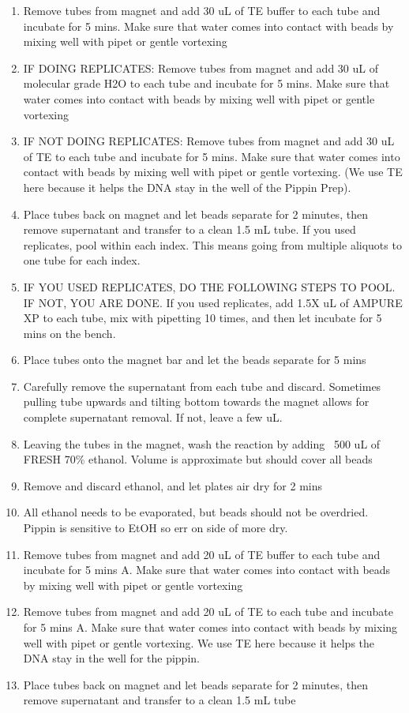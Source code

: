 \documentclass[11pt, oneside]{article}
\begin{document}
\begin{enumerate}
		\item Remove tubes from magnet and add 30 uL of TE buffer to each tube and incubate for 5 mins. Make sure that water comes into contact with beads by mixing well with pipet or gentle vortexing
		\item IF DOING REPLICATES: Remove tubes from magnet and add 30 uL of molecular grade H2O to each tube and incubate for 5 mins. Make sure that water comes into contact with beads by mixing well with pipet or gentle vortexing
    \item IF NOT DOING REPLICATES: Remove tubes from magnet and add 30 uL of TE to each tube and incubate for 5 mins. Make sure that water comes into contact with beads by mixing well with pipet or gentle vortexing. (We use TE here because it helps the DNA stay in the well of the Pippin Prep).
		\item Place tubes back on magnet and let beads separate for 2 minutes, then remove supernatant and transfer to a clean 1.5 mL tube.  If you used replicates, pool within each index. This means going from multiple aliquots to one tube for each index.
		\item IF YOU USED REPLICATES, DO THE FOLLOWING STEPS TO POOL.  IF NOT, YOU ARE DONE. If you used replicates, add 1.5X uL of AMPURE XP to each tube, mix with pipetting 10 times, and then let incubate for 5 mins on the bench.  
		\item Place tubes onto the magnet bar and let the beads separate for 5 mins
		\item Carefully remove the supernatant from each tube and discard.  Sometimes pulling tube upwards and tilting bottom towards the magnet allows for complete supernatant removal. If not, leave a few uL.
		\item Leaving the tubes in the magnet, wash the reaction by adding ~500 uL of FRESH 70\% ethanol. Volume is approximate but should cover all beads
		\item Remove and discard ethanol, and let plates air dry for 2 mins
		\item All ethanol needs to be evaporated, but beads should not be overdried. Pippin is sensitive to EtOH so err on side of more dry.
		\item Remove tubes from magnet and add 20 uL of TE buffer to each tube and incubate for 5 mins A. Make sure that water comes into contact with beads by mixing well with pipet or gentle vortexing
		\item Remove tubes from magnet and add 20 uL of TE to each tube and incubate for 5 mins A. Make sure that water comes into contact with beads by mixing well with pipet or gentle vortexing.  We use TE here because it helps the DNA stay in the well for the pippin.
		\item Place tubes back on magnet and let beads separate for 2 minutes, then remove supernatant and transfer to a clean 1.5 mL tube
		\end{enumerate}
\end{document}

